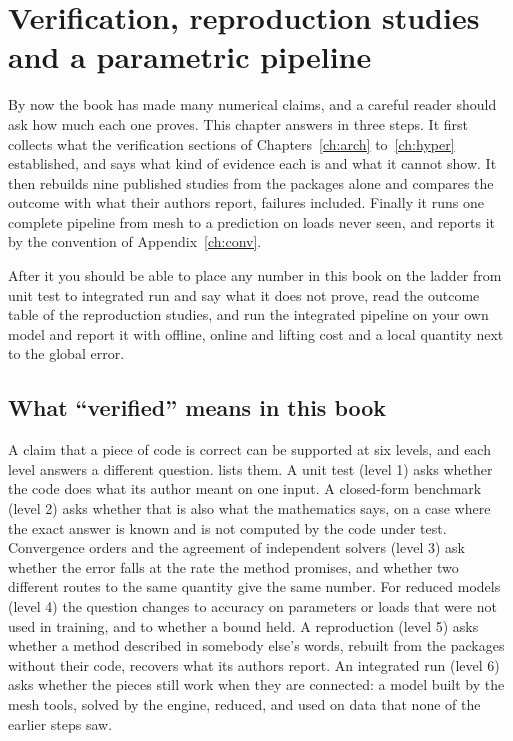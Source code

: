 \chapter{Verification, reproduction studies and a parametric pipeline}\label{ch:verif}

\begin{tcolorbox}[colback=hpale,colframe=hnavy!60,coltitle=white,colbacktitle=hnavy!85,title={In this chapter}]
By now the book has made many numerical claims, and a careful reader should ask how much each one proves. This chapter answers in three steps. It first collects what the verification sections of Chapters~\ref{ch:arch} to~\ref{ch:hyper} established, and says what kind of evidence each is and what it cannot show. It then rebuilds nine published studies from the packages alone and compares the outcome with what their authors report, failures included. Finally it runs one complete pipeline from mesh to a prediction on loads never seen, and reports it by the convention of Appendix~\ref{ch:conv}.\par\smallskip
After it you should be able to place any number in this book on the ladder from unit test to integrated run and say what it does not prove, read the outcome table of the reproduction studies, and run the integrated pipeline on your own model and report it with offline, online and lifting cost and a local quantity next to the global error.
\end{tcolorbox}

\section{What ``verified'' means in this book}\label{sec:vf-levels}

A claim that a piece of code is correct can be supported at six levels, and each level answers a different question.  lists them. A unit test (level 1) asks whether the code does what its author meant on one input. A closed-form benchmark (level 2) asks whether that is also what the mathematics says, on a case where the exact answer is known and is not computed by the code under test. Convergence orders and the agreement of independent solvers (level 3) ask whether the error falls at the rate the method promises, and whether two different routes to the same quantity give the same number. For reduced models (level 4) the question changes to accuracy on parameters or loads that were not used in training, and to whether a bound held. A reproduction (level 5) asks whether a method described in somebody else's words, rebuilt from the packages without their code, recovers what its authors report. An integrated run (level 6) asks whether the pieces still work when they are connected: a model built by the mesh tools, solved by the engine, reduced, and used on data that none of the earlier steps saw.

